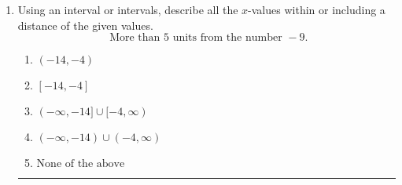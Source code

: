 \documentclass[14pt]{extbook}
\newcommand{\litem}[1]{\item#1\hspace*{-1cm}\rule{\textwidth}{0.4pt}}
\begin{document}
\begin{enumerate}
{\begin{enumerate}[label=\Alph*.]
\end{enumerate} }
\litem{
Using an interval or intervals, describe all the $x$-values within or including a distance of the given values.\[ \text{ More than } 5 \text{ units from the number } -9. \]\begin{enumerate}[label=\Alph*.]
\item \( (-14, -4) \)
\item \( [-14, -4] \)
\item \( (-\infty, -14] \cup [-4, \infty) \)
\item \( (-\infty, -14) \cup (-4, \infty) \)
\item \( \text{None of the above} \)

\end{enumerate} }
\end{enumerate}
\end{document}
